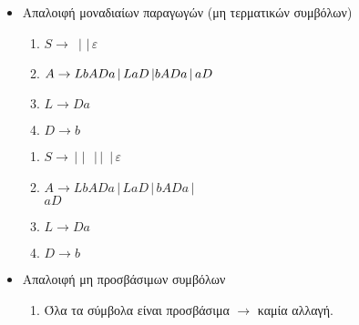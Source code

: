 \begin{tcolorbox}[colback=yellow!15!white, colframe=blue!50!white,
	fonttitle=\bfseries\Large, title = Μετατροπή $CFG\rightarrow CNF$ 1/3]
\begin{itemize}
\begin{minipage}[t]{0.5\textwidth}
\begin{enumerate}
				\item $L\rightarrow Da$

				\item $D\rightarrow b$
			\end{enumerate}
		\end{minipage}

	\bigskip \medskip
	\item Απαλοιφή μοναδιαίων παραγωγών (μη τερματικών συμβόλων)
	\reducevspace\reducevspace\reducevspace\reducevspace\reducevspace\reducevspace\reducevspace

	\begin{minipage}[t]{0.5\textwidth}
			\begin{enumerate}

				\item $S\rightarrow$
				\textcolor{purple}{}$\,|\,$\textcolor{purple}{}$\,|\, \varepsilon$

				\item $A\rightarrow LbADa \,|\, LaD \,|\\
									bADa \,|\, aD$

				\item $L\rightarrow Da$

				\item $D\rightarrow b$
			\end{enumerate}
	\end{minipage}%
	\hfill
	\begin{minipage}[t]{0.5\textwidth}
		\begin{enumerate}
			\item
			$S\rightarrow$\textcolor{violet}{}$\,|\,$\textcolor{violet}{}$\,|\,$
			\textcolor{violet}{}$\,|$\textcolor{violet}{}$\,|$
			\textcolor{violet}{}$\,|\, \varepsilon$

			\item $A\rightarrow LbADa \,|\, LaD \,|\, bADa \,|$\\
					 			$aD$

			\item $L\rightarrow Da$

			\item $D\rightarrow b$
		\end{enumerate}
	\end{minipage}

	\bigskip \medskip
	\item Απαλοιφή μη προσβάσιμων συμβόλων
	\reducevspace\reducevspace\reducevspace\reducevspace\reducevspace\reducevspace\reducevspace
		\begin{enumerate}
			\item Όλα τα σύμβολα είναι προσβάσιμα $\rightarrow$ καμία αλλαγή.
		\end{enumerate}




\end{itemize}
\end{tcolorbox}
